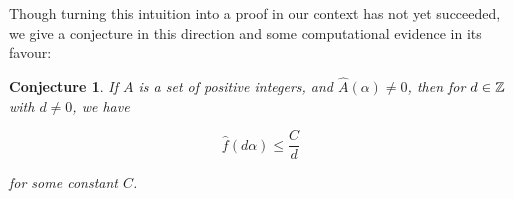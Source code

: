 \documentclass{article}
\newtheorem{conjecture}[theorem]{Conjecture}
\theoremstyle{definition}
\theoremstyle{remark}
\numberwithin{equation}{section}
\begin{document}
Though turning this intuition into a proof in our context has not yet
succeeded, we give a conjecture in this direction and some
computational evidence in its favour: 

\begin{conjecture}\label{conj:decay} 
  If $A$ is a \relevant set of positive integers, and
  $\widehat{A}(\alpha) \neq 0$, then for $d \in \mathbb{Z}$ with $d \neq 0$,
  we have

  \[\widehat{f}(d\alpha) \leq \frac{C}{d}\]

  for some constant $C$.  
\end{conjecture}






\end{document}
